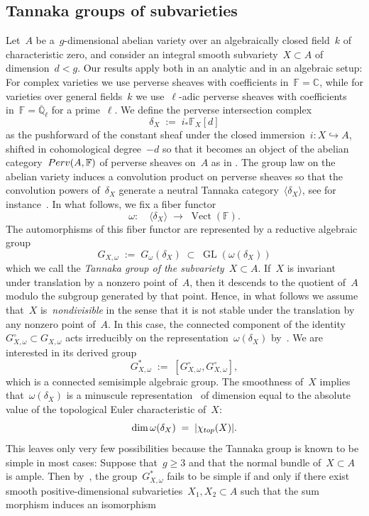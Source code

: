 \documentclass[a4paper]{amsart}
\newcommand{\bbC}{\mathbb{C}}
\newcommand{\bbF}{\mathbb{F}}
\newcommand{\bbQ}{\mathbb{Q}}
\renewcommand{\top}{\textup{top}}
\newcommand{\into}{\hookrightarrow}
\newcommand{\too}{\longrightarrow}
\newcommand{\Perv}{\textup{Perv}}
\DeclareMathOperator{\Vect}{Vect}
\DeclareMathOperator{\GL}{GL}
\renewcommand{\ge}{\geqslant}
\theoremstyle{plain}
\theoremstyle{definition}
\numberwithin{equation}{section}
\begin{document}
\subsection{Tannaka groups of subvarieties} \label{sec:TannakaGroupIntro} Let~$A$ be a~$g$-dimensional abelian variety over an algebraically closed field~$k$ of characteristic zero, and consider an integral smooth subvariety~$X\subset A$ of dimension~$d<g$. Our results apply both in an analytic and in an algebraic setup: For complex varieties we use perverse sheaves with coefficients in~$\bbF = \bbC$, while for varieties over general fields~$k$ we use~$\ell$-adic perverse sheaves with coefficients in~$\bbF = \overline{\bbQ}_\ell$ for a prime~$\ell$. We define the perverse intersection complex 
%
\[ \delta_X \;:=\; i_\ast\bbF_X[d] \]
%
as the pushforward of the constant sheaf under the closed immersion~$i \colon X \into A$, shifted in cohomological degree~$-d$ so that it becomes an object of the abelian category~$\Perv(A, \bbF)$  of perverse sheaves on~$A$ as in \cite{BBDG}. The group law on the abelian variety induces a convolution product on perverse sheaves so that the convolution powers of~$\delta_X$ generate a neutral Tannaka category~$\langle \delta_X \rangle$, see for instance~\cite[sect.~3]{JKLM}.
In what follows, we fix a fiber functor 
%
\[
 \omega \colon \quad \langle \delta_X \rangle \;\too\; \Vect(\bbF).
\]
%
The automorphisms of this fiber functor are represented by a reductive algebraic group 
%
\[G_{X, \omega}\; := \; G_{\omega}(\delta_X)\; \subset \; \GL(\omega(\delta_X)) \] 
%
which we call the \emph{Tannaka group of the subvariety~$X\subset A$}. If~$X$ is invariant under translation by a nonzero point of~$A$, then it descends to the quotient of~$A$ modulo the subgroup generated by that point. Hence, in what follows we assume that~$X$ is~\emph{nondivisible} in the sense that it is not stable under the translation by any nonzero point of~$A$. In this case, the connected component of the identity~$G_{X,\omega}^\circ \subset G_{X,\omega}$ acts irreducibly on the representation~$\omega(\delta_X)$ by~\cite[prop.~3.3]{JKLM}. We are  interested in its derived group
%
\[
 G_{X,\omega}^\ast \;:=\; [G_{X,\omega}^\circ, G_{X,\omega}^\circ],
\]
%
which is a connected semisimple algebraic group. 
The smoothness of~$X$ implies that~$\omega(\delta_X)$ is a minuscule representation~\cite[cor.~1.10]{KraemerMicrolocalI} \cite[cor 5.15]{JKLM} of dimension equal to the absolute value of the topological Euler characteristic of~$X$:
\[ \dim \omega(\delta_X) \; = \; |\chi_{\top}(X)|. \]
This leaves only very few possibilities because the Tannaka group is known to be simple in most cases: Suppose that~$g\ge 3$ and that the normal bundle of~$X\subset A$ is ample. Then by~\cite[th. A]{JKLM}, the  group~$G_{X, \omega}^\ast$ fails to be simple if and only if there exist smooth positive-dimensional subvarieties~$X_1, X_2 \subset A$ such that the sum morphism induces an isomorphism
\end{document}

